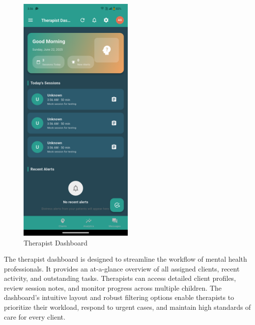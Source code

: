 \documentclass[12pt,a4paper]{article}
\begin{document}
\begin{figure}[H]
    \centering
    \includegraphics[width=0.5\textwidth]{Screenshots/therapistdashboard.png}
    \caption{Therapist Dashboard}
    \label{fig:therapist-dashboard}
\end{figure}
The therapist dashboard is designed to streamline the workflow of mental health professionals. It provides an at-a-glance overview of all assigned clients, recent activity, and outstanding tasks. Therapists can access detailed client profiles, review session notes, and monitor progress across multiple children. The dashboard's intuitive layout and robust filtering options enable therapists to prioritize their workload, respond to urgent cases, and maintain high standards of care for every client.
\end{document}

